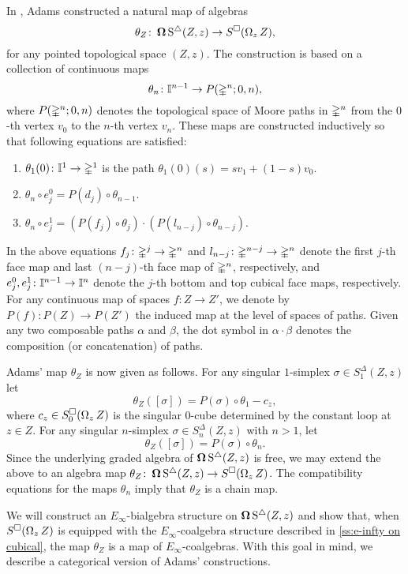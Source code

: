 In \cite{adams1956cobar}, Adams constructed a natural map of algebras
\begin{equation} \label{e:adams map 2}
\theta_Z \colon \operatorname{\mathbf{\Omega}} \operatorname{S^{\triangle}}(Z, z) \to S^{\square}(\operatorname{\Omega}_z Z),
\end{equation}
for any pointed topological space $(Z, z)$.
The construction is based on a collection of continuous maps
\[
\theta_n \colon \mathbb{I}^{n-1} \to P(\mathbb{\Delta}^n;0,n),
\]
where $P(\mathbb{\Delta}^n;0,n)$ denotes the topological space of Moore paths in $\mathbb{\Delta}^n$ from the $0$-th vertex $v_0$ to the $n$-th vertex $v_n$.
These maps are constructed inductively so that following equations are satisfied:
\begin{enumerate}
	\item $\theta_1(0)\colon \mathbb{I}^1 \to \mathbb{\Delta}^1$ is the path $\theta_1(0)(s) = sv_1 +(1-s)v_0$.
	\item $\theta_n \circ e_j^0 = P(d_j) \circ \theta_{n-1}$.
	\item $\theta_n \circ e_j^1 = (P(f_j) \circ \theta_j) \cdot (P(l_{n-j}) \circ \theta_{n-j})$.
\end{enumerate}
In the above equations $f_j\colon \mathbb{\Delta}^j \rightarrow \mathbb{\Delta}^n$ and $l_{n-j}\colon \mathbb{\Delta}^{n-j} \rightarrow \mathbb{\Delta}^n$ denote the first $j$-th face map and last $(n-j)$-th face map of $\mathbb{\Delta}^n$, respectively, and
$e_j^0,e_j^1\colon \mathbb{I}^{n-1} \rightarrow \mathbb{I}^{n}$ denote the $j$-th bottom and top cubical face maps, respectively.
For any continuous map of spaces $f \colon Z \to Z'$, we denote by $P(f) \colon P(Z) \to P(Z')$ the induced map at the level of spaces of paths.
Given any two composable paths $\alpha$ and $\beta$, the dot symbol in $\alpha \cdot \beta$ denotes the composition (or concatenation) of paths.

Adams' map $\theta_Z$ is now given as follows.
For any singular $1$-simplex $\sigma \in S^{\Delta}_1(Z, z)$ let
\[
\theta_Z([\sigma]) = P(\sigma) \circ \theta_1 - c_z,
\]
where $c_z \in S^{\square}_0(\operatorname{\Omega}_z Z)$ is the singular $0$-cube determined by the constant loop at $z \in Z$.
For any singular $n$-simplex $\sigma \in S^{\Delta}_n(Z, z)$ with $n>1$, let
\[
\theta_Z([\sigma]) = P(\sigma) \circ \theta_n.
\]
Since the underlying graded algebra of $\operatorname{\mathbf{\Omega}} \operatorname{S^{\triangle}}(Z, z)$ is free, we may extend the above to an algebra map $\theta_Z \colon \operatorname{\mathbf{\Omega}} \operatorname{S^{\triangle}}(Z, z) \to S^{\square}(\operatorname{\Omega}_z Z)$.
The compatibility equations for the maps $\theta_n$ imply that $\theta_Z$ is a chain map.

We will construct an $E_{\infty}$-bialgebra structure on $\operatorname{\mathbf{\Omega}} \operatorname{S^{\triangle}}(Z, z)$ and show that, when $S^{\square}(\operatorname{\Omega}_z Z)$ is equipped with the $E_{\infty}$-coalgebra structure described in \cref{ss:e-infty on cubical}, the map $\theta_Z$ is a map of $E_{\infty}$-coalgebras.
With this goal in mind, we describe a categorical version of Adams' constructions.

